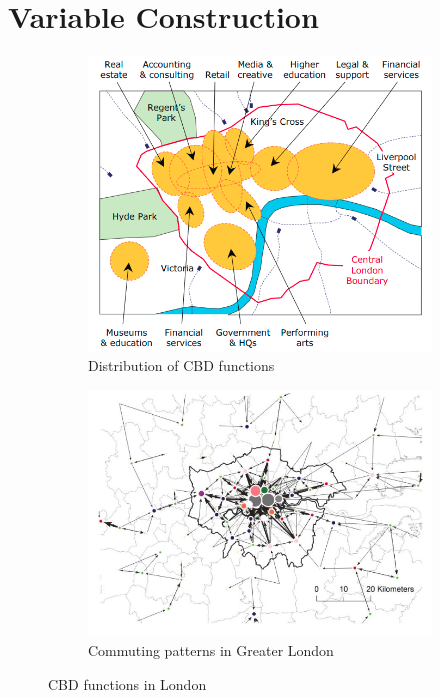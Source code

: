 \documentclass{article}
\begin{document}
\section{Variable Construction} \label{section:variables}
\begin{figure}[t]
\begin{subfigure}{.5\textwidth}
  \centering
  \includegraphics[width=.9\linewidth]{images/cbd.png}
\caption{Distribution of CBD functions \citep{GreaterLondonAuthority2008LondonsImportance}}
  \label{fig:cbd}
\end{subfigure}%
\begin{subfigure}{.5\textwidth}
  \centering
  \includegraphics[width=.9\linewidth]{images/park2011.png}
  \caption{Commuting patterns in Greater London \citep{Park2011SpatialAngeles}}
  \label{fig:park2011}
\end{subfigure}
\caption{CBD functions in London}
\label{fig:2}
\end{figure}
\end{document}
